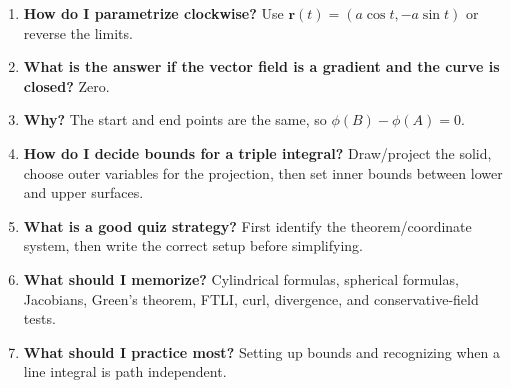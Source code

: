 \documentclass[11pt]{article}
\begin{document}
\begin{enumerate}
\item \textbf{How do I parametrize clockwise?} Use $\mathbf r(t)=(a\cos t,-a\sin t)$ or reverse the limits.
\item \textbf{What is the answer if the vector field is a gradient and the curve is closed?} Zero.
\item \textbf{Why?} The start and end points are the same, so $\phi(B)-\phi(A)=0$.
\item \textbf{How do I decide bounds for a triple integral?} Draw/project the solid, choose outer variables for the projection, then set inner bounds between lower and upper surfaces.
\item \textbf{What is a good quiz strategy?} First identify the theorem/coordinate system, then write the correct setup before simplifying.
\item \textbf{What should I memorize?} Cylindrical formulas, spherical formulas, Jacobians, Green's theorem, FTLI, curl, divergence, and conservative-field tests.
\item \textbf{What should I practice most?} Setting up bounds and recognizing when a line integral is path independent.
\end{enumerate}
\end{document}
